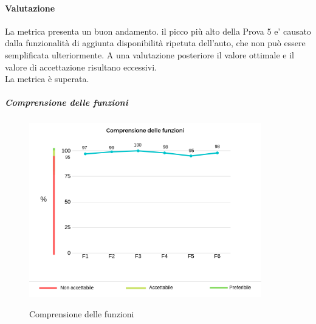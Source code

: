 	\paragraph*{Valutazione} La metrica presenta un buon andamento. il picco più  alto della Prova 5 e' causato dalla funzionalità  di aggiunta disponibilità  ripetuta dell'auto, che non può  essere semplificata ulteriormente. A una valutazione posteriore il valore ottimale e il valore di accettazione risultano eccessivi. 
	\\ La metrica è superata.
	\pagebreak
	\subparagraph{Comprensione delle funzioni}
	\begin{center}
		\begin{figure}[h] 
			\centering 
			\includegraphics[width=0.90\textwidth]{res/images/new/comprensioneFunzioni.png}\\
			\caption{Comprensione delle funzioni}
		\end{figure}
	\end{center}
